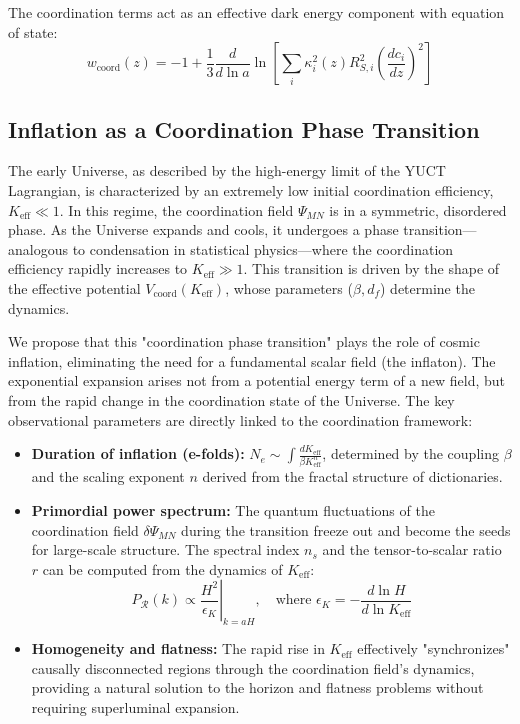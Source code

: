 \documentclass[11pt,a4paper]{article}
\begin{document}
	The coordination terms act as an effective dark energy component with equation of state:
	\begin{equation}
		w_{\text{coord}}(z) = -1 + \frac{1}{3} \frac{d}{d\ln a} \ln \left[ \sum_i \kappa_i^2(z) R_{S,i}^2 \left(\frac{dc_i}{dz}\right)^2 \right]
	\end{equation}
	
	
	\subsection{Inflation as a Coordination Phase Transition}
	\label{subsec:inflation-transition}
	
	The early Universe, as described by the high-energy limit of the YUCT Lagrangian, is characterized by an extremely low initial coordination efficiency, \(K_{\mathrm{eff}} \ll 1\). In this regime, the coordination field \(\Psi_{MN}\) is in a symmetric, disordered phase. As the Universe expands and cools, it undergoes a phase transition—analogous to condensation in statistical physics—where the coordination efficiency rapidly increases to \(K_{\mathrm{eff}} \gg 1\). This transition is driven by the shape of the effective potential \(V_{\mathrm{coord}}(K_{\mathrm{eff}})\), whose parameters (\(\beta, d_f\)) determine the dynamics.
	
	We propose that this "coordination phase transition" plays the role of cosmic inflation, eliminating the need for a fundamental scalar field (the inflaton). The exponential expansion arises not from a potential energy term of a new field, but from the rapid change in the coordination state of the Universe. The key observational parameters are directly linked to the coordination framework:
	
	\begin{itemize}
		\item \textbf{Duration of inflation (e-folds):} \(N_e \sim \int \frac{dK_{\mathrm{eff}}}{\beta K_{\mathrm{eff}}^n} \), determined by the coupling \(\beta\) and the scaling exponent \(n\) derived from the fractal structure of dictionaries.
		\item \textbf{Primordial power spectrum:} The quantum fluctuations of the coordination field \(\delta \Psi_{MN}\) during the transition freeze out and become the seeds for large-scale structure. The spectral index \(n_s\) and the tensor-to-scalar ratio \(r\) can be computed from the dynamics of \(K_{\mathrm{eff}}\):
		\begin{equation}
			P_{\mathcal{R}}(k) \propto \left. \frac{H^2}{\epsilon_K} \right|_{k=aH}, \quad \text{where } \epsilon_K = -\frac{d\ln H}{d\ln K_{\mathrm{eff}}}
		\end{equation}
		\item \textbf{Homogeneity and flatness:} The rapid rise in \(K_{\mathrm{eff}}\) effectively "synchronizes" causally disconnected regions through the coordination field's dynamics, providing a natural solution to the horizon and flatness problems without requiring superluminal expansion.
	\end{itemize}
	
\end{document}
